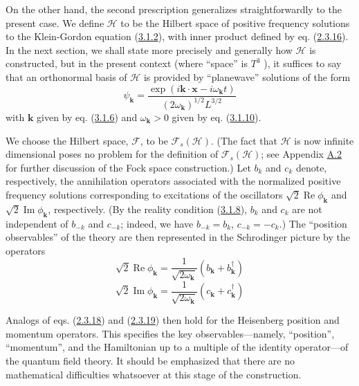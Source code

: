 \documentclass[11pt,a4paper]{article}
\begin{document}
On the other hand, the second prescription generalizes straightforwardly to the present case. We define \(\mathcal{H}\) to be the Hilbert space of positive frequency solutions to the Klein-Gordon equation (\hyperref[eq:3.1.2]{3.1.2}), with inner product defined by eq. (\hyperref[eq:2.3.16]{2.3.16}). In the next section, we shall state more precisely and generally how \(\mathcal{H}\) is constructed, but in the present context (where ``space'' is \(T^3\) ), it suffices to say that an orthonormal basis of \(\mathcal{H}\) is provided by ``planewave\hypertarget{source-47}{}'' solutions of the form
\begin{equation*}
\psi_{\mathbf{k}} = \frac{\exp(i\mathbf{k} \cdot \mathbf{x} - i\omega_{\mathbf{k}}t)}{(2\omega_{\mathbf{k}})^{1/2}L^{3/2}} \tag{3.1.11}\label{eq:3.1.11}
\end{equation*}
with \(\mathbf k\) given by eq. (\hyperref[eq:3.1.6]{3.1.6}) and \(\omega_{\mathbf{k}} > 0\) given by eq. (\hyperref[eq:3.1.10]{3.1.10}).

We choose the Hilbert space, \(\mathcal{F}\), to be \(\mathcal{F}_s(\mathcal{H})\). (The fact that \(\mathcal{H}\) is now infinite dimensional poses no problem for the definition of \(\mathcal{F}_s(\mathcal{H})\); see Appendix \hyperlink{sec:A.2}{A.2} for further discussion of the Fock space construction.) Let \(b_k\) and \(c_k\) denote, respectively, the annihilation operators associated with the normalized positive frequency solutions corresponding to excitations of the oscillators \(\sqrt2\operatorname{Re}\phi_{\mathbf k}\) and \(\sqrt2\operatorname{Im}\phi_{\mathbf k}\), respectively. (By the reality condition (\hyperref[eq:3.1.8]{3.1.8}), \(b_k\) and \(c_k\) are not independent of \(b_{-k}\) and \(c_{-k}\); indeed, we have \(b_{-k} = b_k\), \(c_{-k} = -c_k\).) The ``position observables'' of the theory are then represented in the Schrodinger picture by the operators
\begin{equation*}
\sqrt{2} \operatorname{Re} \phi_{\mathbf{k}} = \frac{1}{\sqrt{2\omega_{\mathbf{k}}}} (b_{\mathbf{k}} + b_{\mathbf{k}}^{\dagger}) \tag{3.1.12}\label{eq:3.1.12}
\end{equation*}
\begin{equation*}
\sqrt{2} \operatorname{Im} \phi_{\mathbf{k}} = \frac{1}{\sqrt{2\omega_{\mathbf{k}}}} (c_{\mathbf{k}} + c_{\mathbf{k}}^{\dagger}) \tag{3.1.13}\label{eq:3.1.13}
\end{equation*}

Analogs of eqs. (\hyperref[eq:2.3.18]{2.3.18}) and (\hyperref[eq:2.3.19]{2.3.19}) then hold for the Heisenberg position and momentum operators. This specifies the key observables---namely, ``position'', ``momentum'', and the Hamiltonian up to a multiple of the identity operator---of the quantum field theory. It should be emphasized that there are no mathematical difficulties whatsoever at this stage of the construction.
\end{document}
